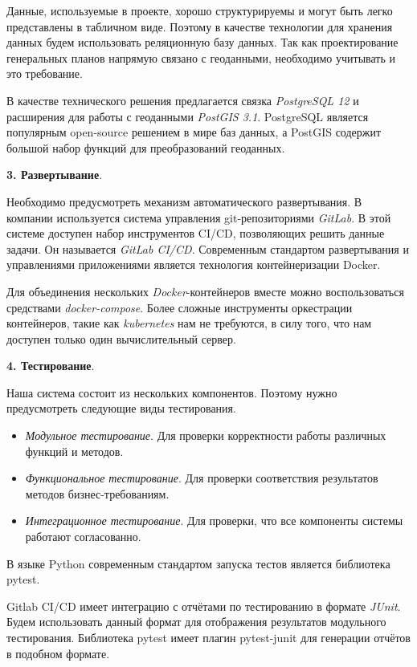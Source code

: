 Данные, используемые в проекте, хорошо структурируемы и могут быть легко представлены в табличном виде.
Поэтому в качестве технологии для хранения данных будем использовать реляционную базу данных.
Так как проектирование генеральных планов напрямую связано с геоданными, необходимо учитывать и это требование.

В качестве технического решения предлагается связка \textit{PostgreSQL 12} и расширения для работы с геоданными
\textit{PostGIS 3.1}. PostgreSQL является популярным open-source решением в мире баз данных,
а PostGIS содержит большой набор функций для преобразований геоданных\cite{PostGIS}.

\noindent \textbf{3. Развертывание}.

Необходимо предусмотреть механизм автоматического развертывания.
В компании используется система управления git-репозиториями \textit{GitLab}.
В этой системе доступен набор инструментов CI/CD, позволяющих решить данные задачи. Он называется \textit{GitLab CI/CD}.
Современным стандартом развертывания и управлениями приложениями является технология контейнеризации
Docker\cite{Docker}.

Для объединения нескольких \textit{Docker}-контейнеров вместе можно воспользоваться средствами \textit{docker-compose}.
Более сложные инструменты оркестрации контейнеров, такие как \textit{kubernetes} нам не требуются, в силу того,
что нам доступен только один вычислительный сервер.

\noindent \textbf{4. Тестирование}.

Наша система состоит из нескольких компонентов. Поэтому нужно предусмотреть следующие виды тестирования\cite{ArtOfTesting}.
\begin{itemize}
    \item \textit{Модульное тестирование}. Для проверки корректности работы различных функций и методов.
    \item \textit{Функциональное тестирование}. Для проверки соответствия результатов методов бизнес-требованиям.
    \item \textit{Интеграционное тестирование}. Для проверки, что все компоненты системы работают согласованно.
\end{itemize}

В языке Python современным стандартом запуска тестов является библиотека pytest.

Gitlab CI/CD имеет интеграцию с отчётами по тестированию в формате \textit{JUnit}.
Будем использовать данный формат для отображения результатов модульного тестирования.
Библиотека pytest имеет плагин pytest-junit для генерации отчётов в подобном формате.

